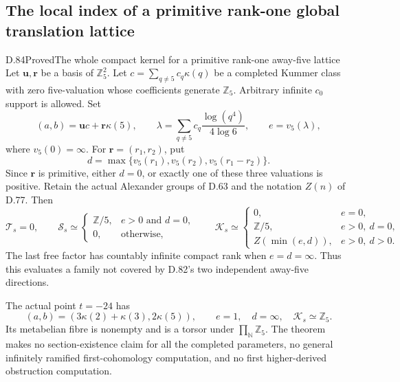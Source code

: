 \subsection{The local index of a primitive rank-one global translation lattice}

\begin{statement}{D.84}{Proved}{The whole compact kernel for a primitive rank-one away-five lattice}
Let \(\mathbf u,\mathbf r\) be a basis of \(\mathbb Z_5^2\).
Let \(c=\sum_{q\ne5}c_q\kappa(q)\) be a completed Kummer
class with zero five-valuation whose coefficients generate
\(\mathbb Z_5\). Arbitrary infinite \(c_0\) support is allowed.
Set
\[
 (a,b)=\mathbf u c+\mathbf r\kappa(5),\qquad
 \lambda=\sum_{q\ne5}c_q\frac{\log(q^4)}{4\log6},\qquad
 e=v_5(\lambda),
                                                                  \tag{D.84.1}
\]
where \(v_5(0)=\infty\). For
\(\mathbf r=(r_1,r_2)\), put
\[
 d=\max\{v_5(r_1),v_5(r_2),v_5(r_1-r_2)\}.
                                                                  \tag{D.84.2}
\]
Since \(\mathbf r\) is primitive, either \(d=0\), or exactly
one of these three valuations is positive. Retain the actual
Alexander groups of D.63 and the notation \(Z(n)\) of D.77.
Then
\[
 \mathcal T_s=0,\qquad
 \mathcal S_s\simeq
 \begin{cases}
  \mathbb Z/5,&e>0\text{ and }d=0,\\
  0,&\text{otherwise},
 \end{cases}
 \qquad
 \mathcal K_s\simeq
 \begin{cases}
  0,&e=0,\\
  \mathbb Z/5,&e>0,\ d=0,\\
  Z(\min(e,d)),&e>0,\ d>0.
 \end{cases}                                                     \tag{D.84.3}
\]
The last free factor has countably infinite compact rank when
\(e=d=\infty\). Thus this evaluates a family not covered by
D.82's two independent away-five directions.

The actual point \(t=-24\) has
\[
 (a,b)=(3\kappa(2)+\kappa(3),2\kappa(5)),\qquad
 e=1,\quad d=\infty,\quad \mathcal K_s\simeq\mathbb Z_5.
                                                                  \tag{D.84.4}
\]
Its metabelian fibre is nonempty and is a torsor under
\(\prod_{\mathbb N}\mathbb Z_5\). The theorem makes no
section-existence claim for all the completed parameters,
no general infinitely ramified first-cohomology computation,
and no first higher-derived obstruction computation.
\end{statement}

